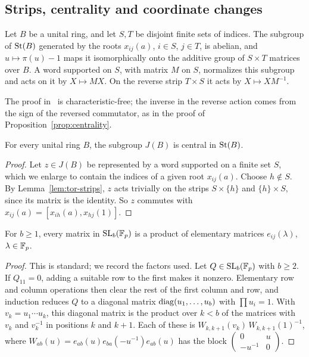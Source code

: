 \subsection{Strips, centrality and coordinate changes}

\begin{lemma}\label{lem:tor-strips}
Let $B$ be a unital ring, and let $S,T$ be disjoint finite sets of indices. The subgroup of $\operatorname{St}(B)$ generated by the
roots $x_{ij}(a)$, $i\in S$, $j\in T$, is abelian, and $u\mapsto\pi(u)-1$ maps it isomorphically onto the additive group
of $S\times T$ matrices over $B$. A word supported on $S$, with matrix $M$ on $S$, normalizes this subgroup and acts on it
by $X\mapsto MX$. On the reverse strip $T\times S$ it acts by $X\mapsto XM^{-1}$.
\end{lemma}

The proof in~\cite{OAI247rf} is characteristic-free; the inverse in the reverse action comes from the sign of the
reversed commutator, as in the proof of Proposition~\ref{prop:centrality}.

\begin{lemma}\label{lem:tor-center}
For every unital ring $B$, the subgroup $J(B)$ is central in $\operatorname{St}(B)$.
\end{lemma}

\begin{proof}
Let $z\in J(B)$ be represented by a word supported on a finite set $S$, which we enlarge to contain the indices of a given
root $x_{ij}(a)$. Choose $h\notin S$. By Lemma~\ref{lem:tor-strips}, $z$ acts trivially on the strips $S\times\{h\}$ and
$\{h\}\times S$, since its matrix is the identity. So $z$ commutes with $x_{ij}(a)=[x_{ih}(a),x_{hj}(1)]$.
\end{proof}

\begin{lemma}\label{lem:tor-SL}
For $b\geq1$, every matrix in $\operatorname{SL}_b(\mathbb F_p)$ is a product of elementary matrices $e_{ij}(\lambda)$, $\lambda\in\mathbb F_p$.
\end{lemma}

\begin{proof}
This is standard; we record the factors used. Let $Q\in\operatorname{SL}_b(\mathbb F_p)$ with $b\geq2$. If $Q_{11}=0$, adding a suitable row
to the first makes it nonzero. Elementary row and column operations then clear the rest of the first column and row,
and induction reduces $Q$ to a diagonal matrix $\operatorname{diag}(u_1,\dots,u_b)$ with $\prod u_i=1$. With $v_k=u_1\cdots u_k$, this
diagonal matrix is the product over $k<b$ of the matrices with $v_k$ and $v_k^{-1}$ in positions $k$ and $k+1$. Each of
these is $W_{k,k+1}(v_k)\,W_{k,k+1}(1)^{-1}$, where $W_{ab}(u)=e_{ab}(u)e_{ba}(-u^{-1})e_{ab}(u)$ has the block
$\left(\begin{smallmatrix}0&u\\-u^{-1}&0\end{smallmatrix}\right)$.
\end{proof}

